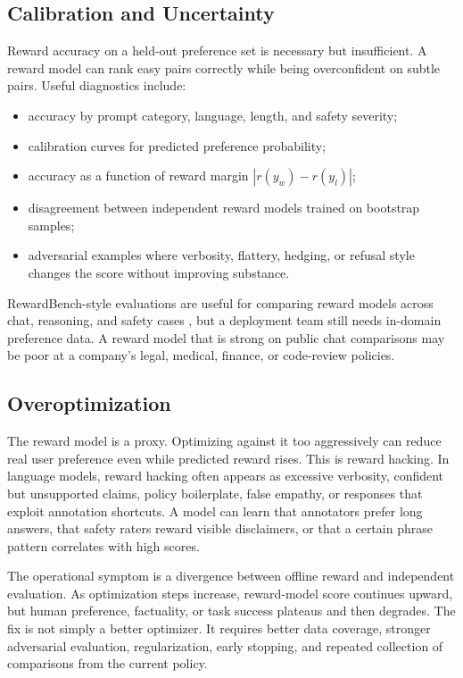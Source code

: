 \subsection{Calibration and Uncertainty}
Reward accuracy on a held-out preference set is necessary but insufficient. A reward model can rank easy pairs correctly while being overconfident on subtle pairs. Useful diagnostics include:
\begin{itemize}
    \item accuracy by prompt category, language, length, and safety severity;
    \item calibration curves for predicted preference probability;
    \item accuracy as a function of reward margin $|r(y_w)-r(y_l)|$;
    \item disagreement between independent reward models trained on bootstrap samples;
    \item adversarial examples where verbosity, flattery, hedging, or refusal style changes the score without improving substance.
\end{itemize}
RewardBench-style evaluations are useful for comparing reward models across chat, reasoning, and safety cases \cite{lambert2024rewardbench}, but a deployment team still needs in-domain preference data. A reward model that is strong on public chat comparisons may be poor at a company's legal, medical, finance, or code-review policies.

\subsection{Overoptimization}
The reward model is a proxy. Optimizing against it too aggressively can reduce real user preference even while predicted reward rises. This is reward hacking. In language models, reward hacking often appears as excessive verbosity, confident but unsupported claims, policy boilerplate, false empathy, or responses that exploit annotation shortcuts. A model can learn that annotators prefer long answers, that safety raters reward visible disclaimers, or that a certain phrase pattern correlates with high scores.

The operational symptom is a divergence between offline reward and independent evaluation. As optimization steps increase, reward-model score continues upward, but human preference, factuality, or task success plateaus and then degrades. The fix is not simply a better optimizer. It requires better data coverage, stronger adversarial evaluation, regularization, early stopping, and repeated collection of comparisons from the current policy.

